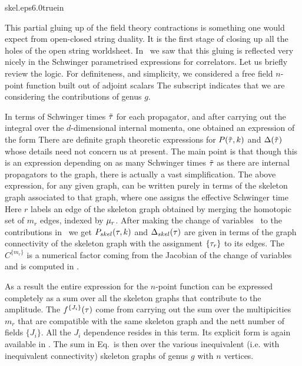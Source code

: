 %
{skel.eps}{6.0truein}
%

This partial gluing up of the field theory contractions is something one
would expect from open-closed string duality. It is the first stage of 
closing up all the holes of the open string worldsheet. In \ffb\
we saw that this gluing is reflected very nicely
in the Schwinger parametrised expressions for correlators. Let us briefly
review the logic. For definiteness,
and simplicity, we considered a free field 
$n$-point function built out of adjoint scalars 
\eqn{}
The subscript indicates that we are considering the contributions
of genus $g$.  

In terms of Schwinger times $\tt$ for each propagator, and after carrying out 
the integral over the $d$-dimensional 
internal momenta, one obtained an expression of the form 
\eqn{}
There are definite graph theoretic 
expressions for $P(\tt,k)$ and $\D(\tt)$ whose details  
need not concern us at present. The main point is that though this
is an expression depending on as many Schwinger times $\tt$ as there are 
internal propagators to the graph, there is actually a vast simplification. 
The above expression, for any given graph, can be written purely
in terms of the 
skeleton graph associated to that graph, where one assigns the
effective Schwinger time 
\eqn{}
Here $r$ labels an edge of the skeleton graph obtained by merging 
the homotopic set of $m_r$ edges, indexed by $\m_r$. 
After making the change of variables \resist\ to the 
contributions in \ttpar\ we get
\eqn\skel{\int_0^{\infty}{\prod_{r,\m_r} d\tt_{r\m_r} \over \D(\tt)^{d\over 2}}
e^{-P(\tt,k)} =C^{\{m_r\}}\int_0^{\infty}
\prod_r({d\t_r\over \t_r^{(m_r-1)({d\over2}-1)}}){e^{-P_{skel}(\t, k)}
\over \D_{skel}(\t)^{d\over 2}}.}
$P_{skel}(\t, k)$ and $\D_{skel}(\t)$ are given in terms of the graph
connectivity of the skeleton graph with the assignment $\{\t_r\}$ to 
its edges. The $C^{\{m_r\}}$ is a numerical factor
coming from the Jacobian of the change of  variables and is 
computed in \ffb . 

As a result the entire expression for the $n$-point function can be 
expressed completely
as a sum over all the skeleton graphs that contribute to the 
amplitude.
\eqn{}
The $f^{\{J_i\}}(\t)$ come from carrying out the sum over the
multipicities $m_r$ that are compatible with the same skeleton graph and 
the nett number of fields ${\{J_i\}}$. All the $J_i$ dependence resides 
in this term. 
Its explicit form is again available
in \ffb . 
The sum in Eq.\schem\ 
is then over the various inequivalent (i.e. with inequivalent connectivity)
skeleton graphs of genus $g$ with $n$ vertices. 

